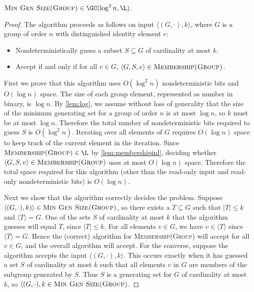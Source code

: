\documentclass{article}
\newcommand{\gen}[1]{{\langle #1 \rangle}}
\begin{document}
\begin{theorem}\label{thm:mingengc}
  $\textsc{Min Gen Size(Group)} \in \GC(\log^2 n, \L)$.
\end{theorem}
\begin{proof}
  The algorithm proceeds as follows on input $\langle (G, \cdot), k \rangle$, where $G$ is a group of order $n$ with distinguished identity element $e$:
  \begin{itemize}
  \item Nondeterministically guess a subset $S \subseteq G$ of cardinality at most $k$.
  \item Accept if and only if for all $v \in G$, $\langle G, S, v \rangle \in \textsc{Membership(Group)}$.
  \end{itemize}

  First we prove that this algorithm uses $O(\log^2 n)$ nondeterministic bits and $O(\log n)$ space.
  The size of each group element, represented as number in binary, is $\log n$.
  By \autoref{lem:log}, we assume without loss of generality that the size of the minimum generating set for a group of order $n$ is at most $\log n$, so $k$ must be at most $\log n$.
  Therefore the total number of nondeterministic bits required to guess $S$ is $O(\log^2 n)$.
  Iterating over all elements of $G$ requires $O(\log n)$ space to keep track of the current element in the iteration.
  Since $\textsc{Membership(Group)} \in \L$ by \autoref{lem:membershipinl}, deciding whether $\langle G, S, v \rangle \in \textsc{Membership(Group)}$ uses at most $O(\log n)$ space.
  Therefore the total space required for this algorithm (other than the read-only input and read-only nondeterministic bits) is $O(\log n)$.

  Next we show that the algorithm correctly decides the problem.
  Suppose $\langle (G, \cdot), k) \rangle \in \textsc{Min Gen Size(Group)}$, so there exists a $T \subseteq G$ such that $|T| \leq k$ and $\gen{T} = G$.
  One of the sets $S$ of cardinality at most $k$ that the algorithm guesses will equal $T$, since $|T| \leq k$.
  For all elements $v \in G$, we have $v \in \gen{T}$ since $\gen{T} = G$.
  Hence the (correct) algorithm for \textsc{Membership(Group)} will accept for all $v \in G$, and the overall algorithm will accept.
  For the converse, suppose the algorithm accepts the input $\langle (G, \cdot), k \rangle$.
  This occurs exactly when it has guessed a set $S$ of cardinality at most $k$ such that all elements $v$ in $G$ are members of the subgroup generated by $S$.
  Thus $S$ is a generating set for $G$ of cardinality at most $k$, so $\langle (G, \cdot), k \in \textsc{Min Gen Size(Group)}$.
\end{proof}
\end{document}
